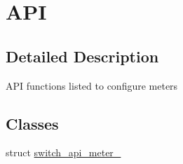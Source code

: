 \hypertarget{group__Meters}{\section{A\+P\+I}
\label{group__Meters}
}


\subsection{Detailed Description}
A\+P\+I functions listed to configure meters \subsection*{Classes}
\begin{DoxyCompactItemize}
\item 
struct \hyperlink{structswitch__api__meter__}{switch\+\_\+api\+\_\+meter\+\_\+}
\end{DoxyCompactItemize}
